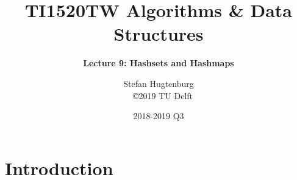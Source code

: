 

\title[Algorithms \& Data Structures]{TI1520TW Algorithms \& Data Structures}
\subtitle{\color{cyan} \textbf{Lecture 9: Hashsets and Hashmaps}}
\author{Stefan Hugtenburg\\ {\tiny{\qquad~~\copyright 2019 TU Delft}}}
\date{2018-2019 Q3}



\frame{\titlepage}

\section{Introduction}













\frame{\titlepage}


